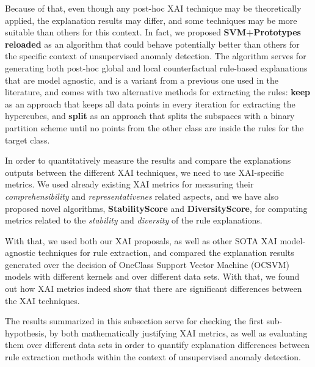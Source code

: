 Because of that, even though any post-hoc XAI technique may be theoretically applied, the explanation results may differ, and some techniques may be more suitable than others for this context. In fact, we proposed \textbf{SVM+Prototypes reloaded} as an algorithm that could behave potentially better than others for the specific context of unsupervised anomaly detection. The algorithm serves for generating both post-hoc global and local counterfactual rule-based explanations that are model agnostic, and is a variant from a previous one used in the literature, and comes with two alternative methods for extracting the rules: \textbf{keep} as an approach that keeps all data points in every iteration for extracting the hypercubes, and \textbf{split} as an approach that splits the subspaces with a binary partition scheme until no points from the other class are inside the rules for the target class.

In order to quantitatively measure the results and compare the explanations outputs between the different XAI techniques, we need to use XAI-specific metrics. We used already existing XAI metrics
for measuring their \textit{comprehensibility} and \textit{representativenes} related aspects, and we have also proposed novel algorithms, \textbf{StabilityScore} and \textbf{DiversityScore}, for computing metrics related to the \textit{stability} and \textit{diversity} of the rule explanations. 

With that, we used both our XAI proposals, as well as other SOTA XAI model-agnostic techniques for rule extraction, and compared the explanation results generated over the decision of OneClass Support Vector Machine (OCSVM) models with different kernels and over different data sets. With that, we found out how XAI metrics indeed show that there are significant differences between the XAI techniques.

The results summarized in this subsection serve for checking the first sub-hypothesis, by both mathematically justifying XAI metrics, as well as evaluating them over different data sets in order to quantify explanation differences between rule extraction methods within the context of unsupervised anomaly detection.

